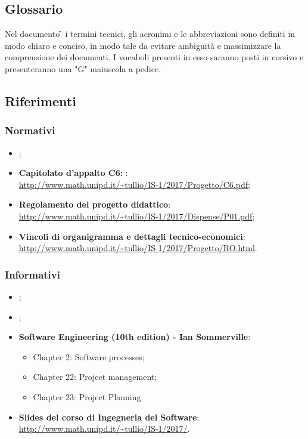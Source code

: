 \subsection{Glossario}
Nel documento \G{} i termini tecnici, gli acronimi e le abbreviazioni sono definiti in modo chiaro e conciso, in modo tale da evitare ambiguità e massimizzare la comprensione dei documenti.
\newline I vocaboli presenti in esso saranno posti in corsivo e presenteranno una "G" maiuscola a pedice.

\subsection{Riferimenti}
\subsubsection{Normativi}
\begin{itemize}
	\item \textbf{\NdP{}};
	\item \textbf{Capitolato d'appalto C6: \NomeProgetto}:\\
	\url{http://www.math.unipd.it/~tullio/IS-1/2017/Progetto/C6.pdf};
	\item \textbf{Regolamento del progetto didattico}:\\
	\url{http://www.math.unipd.it/~tullio/IS-1/2017/Dispense/P01.pdf};
	\item \textbf{Vincoli di organigramma e dettagli tecnico-economici}:\\
	\url{http://www.math.unipd.it/~tullio/IS-1/2017/Progetto/RO.html}.
\end{itemize}
\subsubsection{Informativi}
\begin{itemize}
	\item \textbf{\SdF{}};
	\item \textbf{\AdR{}};
	\item \textbf{Software Engineering (10th edition) - Ian Sommerville}:
	\begin{itemize}
		\item Chapter 2: Software processes;
		\item Chapter 22: Project management;
		\item Chapter 23: Project Planning.
	\end{itemize}
	\item \textbf{Slides del corso di Ingegneria del Software}:\\
	\url{http://www.math.unipd.it/~tullio/IS-1/2017/}.
\end{itemize}

